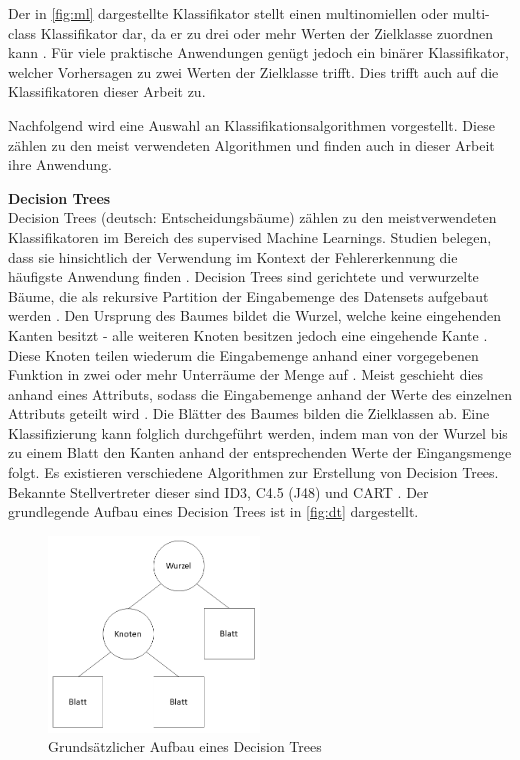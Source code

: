 Der in \autoref{fig:ml} dargestellte Klassifikator stellt einen multinomiellen oder multi-class Klassifikator dar, da er zu drei oder mehr Werten der Zielklasse zuordnen kann \cite{Sammut2017}. Für viele praktische Anwendungen genügt jedoch ein binärer Klassifikator, welcher Vorhersagen zu zwei Werten der Zielklasse trifft. Dies trifft auch auf die Klassifikatoren dieser Arbeit zu.

Nachfolgend wird eine Auswahl an Klassifikationsalgorithmen vorgestellt. Diese zählen zu den meist verwendeten Algorithmen und finden auch in dieser Arbeit ihre Anwendung.

\label{algorithms}
\textbf{Decision Trees\medskip}\\
Decision Trees (deutsch: Entscheidungsbäume) zählen zu den meistverwendeten Klassifikatoren im Bereich des supervised Machine Learnings. Studien belegen, dass sie hinsichtlich der Verwendung im Kontext der Fehlererkennung die häufigste Anwendung finden \cite{Son2019}. Decision Trees sind gerichtete und verwurzelte Bäume, die als rekursive Partition der Eingabemenge des Datensets aufgebaut werden \cite{Rokach2005}. Den Ursprung des Baumes bildet die Wurzel, welche keine eingehenden Kanten besitzt - alle weiteren Knoten besitzen jedoch eine eingehende Kante \cite{Rokach2005}. Diese Knoten teilen wiederum die Eingabemenge anhand einer vorgegebenen Funktion in zwei oder mehr Unterräume der Menge auf \cite{Rokach2005}. Meist geschieht dies anhand eines Attributs, sodass die Eingabemenge anhand der Werte des einzelnen Attributs geteilt wird \cite{Rokach2005}. Die Blätter des Baumes bilden die Zielklassen ab. Eine Klassifizierung kann folglich durchgeführt werden, indem man von der Wurzel bis zu einem Blatt den Kanten anhand der entsprechenden Werte der Eingangsmenge folgt. Es existieren verschiedene Algorithmen zur Erstellung von Decision Trees. Bekannte Stellvertreter dieser sind ID3, C4.5 (J48) und CART \cite{Rokach2005}. Der grundlegende Aufbau eines Decision Trees ist in \autoref{fig:dt} dargestellt.

\begin{figure}[t]
    \centering
    \includegraphics[width=0.5\textwidth]{images/DT}
    \caption{Grundsätzlicher Aufbau eines Decision Trees\label{fig:dt}}
\end{figure}

